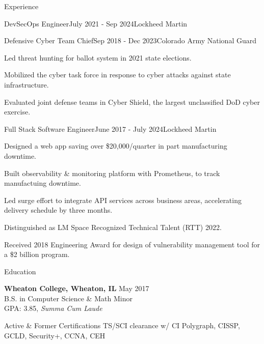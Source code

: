 \documentclass[
	a4paper, %
	11pt, %
]{resume} %
\begin{document}
\begin{rSection}{Experience}
\begin{rSubsection}{DevSecOps Engineer}{July 2021 - Sep 2024}{Lockheed Martin}
	\end{rSubsection}
	\begin{rSubsection}{Defensive Cyber Team Chief}{Sep 2018 - Dec 2023}{Colorado Army National Guard}
		\item Led threat hunting for ballot system in 2021 state elections.
		\item Mobilized the cyber task force in response to cyber attacks against state infrastructure.
		\item Evaluated joint defense teams in Cyber Shield, the largest unclassified DoD cyber exercise.
	\end{rSubsection}
	\begin{rSubsection}{Full Stack Software Engineer}{June 2017 - July 2024}{Lockheed Martin}
		\item Designed a web app saving over \$20,000/quarter in part manufacturing downtime.
		\item Built observability \& monitoring platform with Prometheus, to track manufactuing downtime.
		\item Led surge effort to integrate API services across business areas, accelerating delivery schedule by three months.
		\item Distinguished as LM Space Recognized Technical Talent (RTT) 2022.
		\item Received 2018 Engineering Award for design of vulnerability management tool for a \$2 billion program.
	\end{rSubsection}
\end{rSection}

\begin{rSection}{Education}
	
	\textbf{Wheaton College, Wheaton, IL} \hfill May 2017 \\ 
	B.S. in Computer Science \& Math Minor \\
	GPA: 3.85, \textit{Summa Cum Laude}
	
\end{rSection}
\begin{rSection}{Active \& Former Certifications}
	TS/SCI clearance w/ CI Polygraph, CISSP, GCLD, Security+, CCNA, CEH
\end{rSection}
\end{document}
